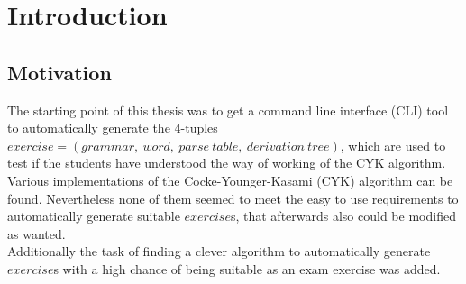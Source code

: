 
\section{Introduction}\label{Introduction}

\subsection{Motivation}

The starting point of this thesis was to get a command line interface (CLI) tool to automatically generate the 4-tuples $exercise = (grammar,\ word,\ parse\ table,\ derivation\ tree)$, which are used to test if the students have understood the way of working of the CYK algorithm.\\
Various implementations of the Cocke-Younger-Kasami (CYK) algorithm can be found. Nevertheless none of them seemed to meet the easy to use requirements to automatically generate suitable $exercise$s, that afterwards also could be modified as wanted.\\
Additionally the task of finding a clever algorithm to automatically generate $exercise$s with a high chance of being suitable as an exam exercise was added. 

